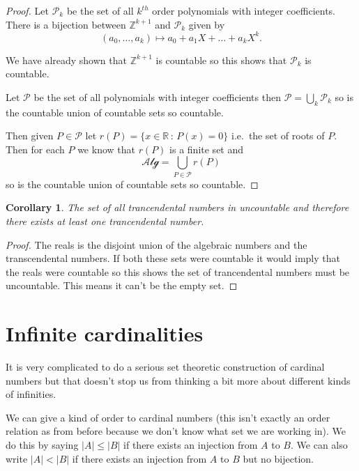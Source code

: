 \documentclass[
]{book}
\newtheorem{corollary}{Corollary}[chapter]
\theoremstyle{definition}
\theoremstyle{definition}
\theoremstyle{definition}
\theoremstyle{definition}
\theoremstyle{remark}
\begin{document}
\begin{proof}
Let \(\mathcal{P}_k\) be the set of all \(k^{th}\) order polynomials with integer coefficients. There is a bijection between \(\mathbb{Z}^{k+1}\) and \(\mathcal{P}_k\) given by
\[ (a_0, \dots, a_k) \mapsto a_0 + a_1 X + \dots + a_k X^k.  \]

We have already shown that \(\mathbb{Z}^{k+1}\) is countable so this shows that \(\mathcal{P}_k\) is countable.

Let \(\mathcal{P}\) be the set of all polynomials with integer coefficients then \(\mathcal{P} = \bigcup_k \mathcal{P}_k\) so is the countable union of countable sets so countable.

Then given \(P \in \mathcal{P}\) let \(r(P) = \{ x \in \mathbb{R} \,:\, P(x) =0\}\) i.e.~the set of roots of \(P\). Then for each \(P\) we know that \(r(P)\) is a finite set and
\[ \mathcal{Alg} = \bigcup_{P\in \mathcal{P}} r(P) \] so is the countable union of countable sets so countable.
\end{proof}

\begin{corollary}
The set of all trancendental numbers in uncountable and therefore there exists at least one trancendental number.
\end{corollary}

\begin{proof}
The reals is the disjoint union of the algebraic numbers and the transcendental numbers. If both these sets were countable it would imply that the reals were countable so this shows the set of trancendental numbers must be uncountable. This means it can't be the empty set.
\end{proof}

\section{Infinite cardinalities}\label{infinite-cardinalities}

It is very complicated to do a serious set theoretic construction of cardinal numbers but that doesn't stop us from thinking a bit more about different kinds of infinities.

We can give a kind of order to cardinal numbers (this isn't exactly an order relation as from before because we don't know what set we are working in). We do this by saying \(|A| \leq |B|\) if there exists an injection from \(A\) to \(B\). We can also write \(|A| < |B|\) if there exists an injection from \(A\) to \(B\) but no bijection.
\end{document}
